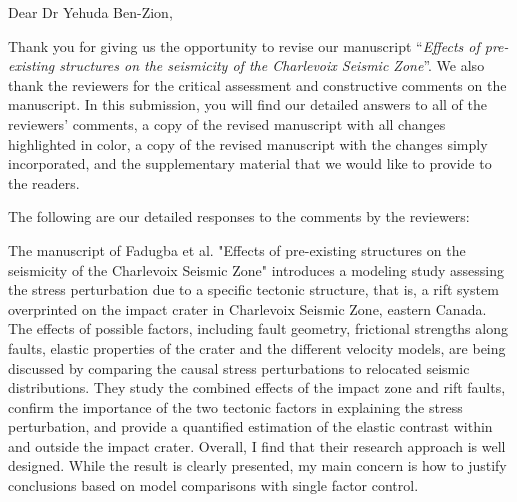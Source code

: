 \documentclass[12pt]{article}
\title{}
\date{}
\newcommand\PaperTitle[1]{``\textit{#1}''}
\begin{document}
\noindent Dear Dr Yehuda Ben-Zion,
\\\vspace{1em}

Thank you for giving us the opportunity to revise our manuscript \PaperTitle{Effects of pre-existing structures on the seismicity of the Charlevoix Seismic Zone}. We also thank the reviewers for the critical assessment and constructive comments on the manuscript. In this submission, you will find our detailed answers to all of the reviewers’ comments, a copy of the revised manuscript with all changes highlighted in color, a copy of the revised manuscript with the changes simply incorporated, and the supplementary material that we would like to provide to the readers.

The following are our detailed responses to the comments by the reviewers:


\begin{response}{The manuscript of Fadugba et al. "Effects of pre-existing structures on the seismicity of the Charlevoix Seismic Zone" introduces a modeling study assessing the stress perturbation due to a specific tectonic structure, that is, a rift system overprinted on the impact crater in Charlevoix Seismic Zone, eastern Canada. The effects of possible factors, including fault geometry, frictional strengths along faults, elastic properties of the crater and the different velocity models, are being discussed by comparing the causal stress perturbations to relocated seismic distributions. They study the combined effects of the impact zone and rift faults, confirm the importance of the two tectonic factors in explaining the stress perturbation, and provide a quantified estimation of the elastic contrast within and outside the impact crater. Overall, I find that their research approach is well designed. While the result is clearly presented, my main concern is how to justify conclusions based on model comparisons with single factor control.}
\end{response}
\end{document}

